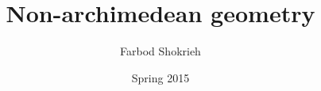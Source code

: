 \documentclass[oneside]{book}
\title{Non-archimedean geometry}
\author{Farbod Shokrieh}
\date{Spring 2015}
\begin{document}

\begin{titlepage}
\maketitle
\thispagestyle{empty}
\end{titlepage}


\frontmatter
\tableofcontents


\mainmatter









\end{document}
